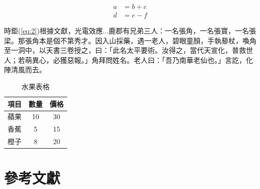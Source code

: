\documentclass[12pt]{article}
\begin{document}
\begin{align}
    a &= b + c \label{eq:1}
    \\
    d &= e - f \label{eq:2}
\end{align}


時鉅(\ref{eq:2})根據文獻\cite{einstein1905}，光電\cite{latexcompanion}效\cite{鄭智銘2006分散式儲存架構下的遠距環境監測系統之建構}應...鹿郡有兄弟三人：一名張角，一名張寶，一名張梁。那張角本是個不第秀才。因入山採藥，遇一老人，碧眼童顏，手執藜杖，喚角至一洞中，以天書三卷授之，曰：「此名太平要術。汝得之，當代天宣化，普救世人；若萌異心，必獲惡報。」角拜問姓名。老人曰：「吾乃南華老仙也。」言訖，化陣清風而去。

\begin{table}[ht]
    \centering
    \begin{tabular}{|c|c|c|}
    \hline
    項目  & 數量 & 價格 \\
    \hline
    蘋果  & 10  & 30   \\
    香蕉  & 5   & 15   \\
    橙子  & 8   & 20   \\
    \hline
    \end{tabular}
    \caption{水果表格}
    \label{tab:fruits}
\end{table}

\section{參考文獻}
\vspace{-3.5em}  %
\renewcommand{\refname}{}  %
\printbibliography  %
\end{document}
